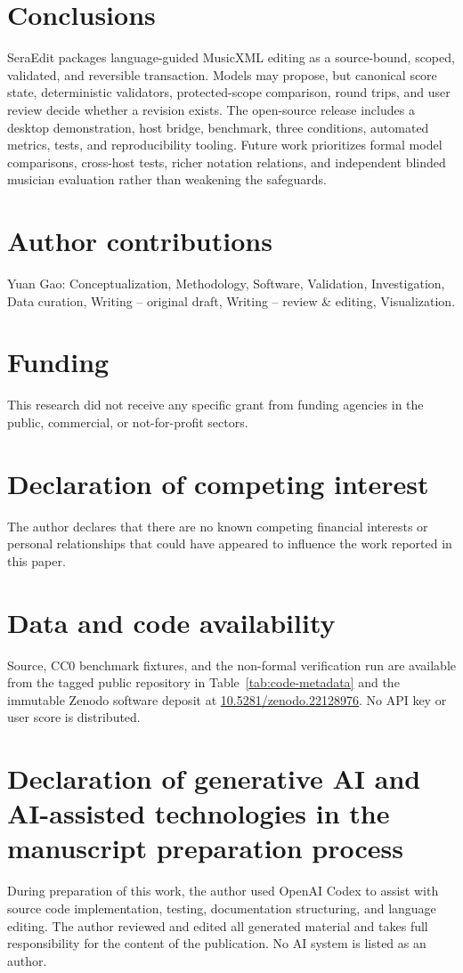 \documentclass[preprint,12pt,a4paper]{elsarticle}
\begin{document}
\section{Conclusions}

SeraEdit packages language-guided MusicXML editing as a source-bound, scoped, validated,
and reversible transaction. Models may propose, but canonical score state,
deterministic validators, protected-scope comparison, round trips, and user review
decide whether a revision exists. The open-source release includes a desktop
demonstration, host bridge, benchmark, three conditions, automated metrics, tests, and
reproducibility tooling. Future work prioritizes formal model comparisons, cross-host
tests, richer notation relations, and independent blinded musician evaluation rather
than weakening the safeguards.

\section*{Author contributions}
Yuan Gao: Conceptualization, Methodology, Software, Validation, Investigation,
Data curation, Writing -- original draft, Writing -- review \& editing, Visualization.

\section*{Funding}
This research did not receive any specific grant from funding agencies in the public,
commercial, or not-for-profit sectors.

\section*{Declaration of competing interest}
The author declares that there are no known competing financial interests or personal
relationships that could have appeared to influence the work reported in this paper.

\section*{Data and code availability}
Source, CC0 benchmark fixtures, and the non-formal verification run are available from
the tagged public repository in Table~\ref{tab:code-metadata} and the immutable Zenodo
software deposit at
\href{https://doi.org/10.5281/zenodo.22128976}{10.5281/zenodo.22128976}.
No API key or user score is distributed.

\section*{Declaration of generative AI and AI-assisted technologies in the manuscript preparation process}
During preparation of this work, the author used OpenAI Codex to assist with source
code implementation, testing, documentation structuring, and language editing. The
author reviewed and edited all generated material and takes full responsibility for
the content of the publication. No AI system is listed as an author.
\end{document}
